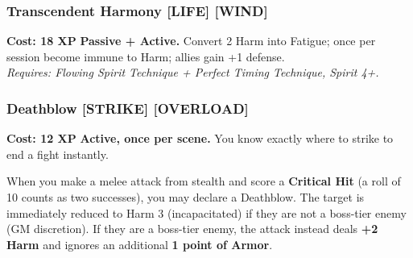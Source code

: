 \subsubsection*{Transcendent Harmony \textnormal{[LIFE] [WIND]}}
\label{talent:transcendent-harmony}
\textbf{Cost: 18 XP} \textbf{Passive + Active.} Convert 2 Harm into Fatigue; once per session become immune to Harm; allies gain +1 defense. \\
\textit{Requires: Flowing Spirit Technique + Perfect Timing Technique, Spirit 4+.}

\subsubsection*{Deathblow \textnormal{[STRIKE] [OVERLOAD]}}
\label{talent:deathblow}
\textbf{Cost: 12 XP} \textbf{Active, once per scene.} You know exactly where to strike to end a fight instantly.

When you make a melee attack from stealth and score a \textbf{Critical Hit} (a roll of 10 counts as two successes), you may declare a Deathblow. The target is immediately reduced to Harm 3 (incapacitated) if they are not a boss-tier enemy (GM discretion). If they are a boss-tier enemy, the attack instead deals \textbf{+2 Harm} and ignores an additional \textbf{1 point of Armor}.

